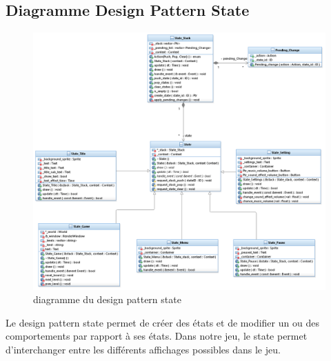 \newpage
\subsection{Diagramme Design Pattern State}
\begin{figure}[h]
	\centering
	\includegraphics[width=\textwidth] {pictures/state.png}
	\caption{diagramme du design pattern state}
	\label{fig:diagramme_design_pattern_state}
\end{figure}
Le design pattern state permet de créer des états et de modifier un ou des comportements par rapport à ses états. Dans notre jeu, le state permet d'interchanger entre les différents affichages possibles dans le jeu.